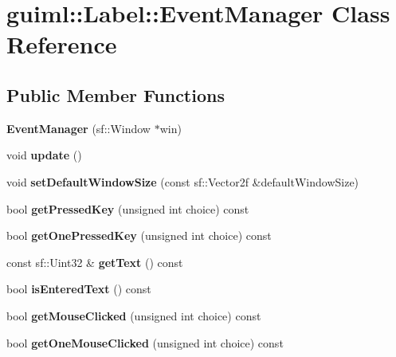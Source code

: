 \section{guiml\-:\-:Label\-:\-:Event\-Manager Class Reference}
\label{classguiml_1_1_label_1_1_event_manager}
\subsection*{Public Member Functions}
\begin{DoxyCompactItemize}
\item 
{\bfseries Event\-Manager} (sf\-::\-Window $\ast$win)\label{classguiml_1_1_label_1_1_event_manager_a86b39c5dfdb981c6d0239c46e3750bde}

\item 
void {\bfseries update} ()\label{classguiml_1_1_label_1_1_event_manager_a2a0a606f55876a95e42531b18b019c6c}

\item 
void {\bfseries set\-Default\-Window\-Size} (const sf\-::\-Vector2f \&default\-Window\-Size)\label{classguiml_1_1_label_1_1_event_manager_a6a7282c2a9a397379ba81284dd7451f8}

\item 
bool {\bfseries get\-Pressed\-Key} (unsigned int choice) const \label{classguiml_1_1_label_1_1_event_manager_aabdeb65664fed45750e7a69c50d541ae}

\item 
bool {\bfseries get\-One\-Pressed\-Key} (unsigned int choice) const \label{classguiml_1_1_label_1_1_event_manager_a54b91c0feb2d6accd574e9808ae6e9fe}

\item 
const sf\-::\-Uint32 \& {\bfseries get\-Text} () const \label{classguiml_1_1_label_1_1_event_manager_ab8db8a2988bc0a63841135c1f7f83482}

\item 
bool {\bfseries is\-Entered\-Text} () const \label{classguiml_1_1_label_1_1_event_manager_a9ecb9148d95edce513056939227b5a55}

\item 
bool {\bfseries get\-Mouse\-Clicked} (unsigned int choice) const \label{classguiml_1_1_label_1_1_event_manager_a64472d2ab0f44428c8dbe67a8dc24201}

\item 
bool {\bfseries get\-One\-Mouse\-Clicked} (unsigned int choice) const \label{classguiml_1_1_label_1_1_event_manager_a318f8373985a62389873b49a8dd3532b}


\end{DoxyCompactItemize}
